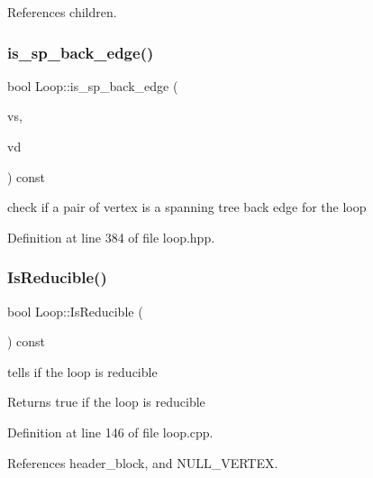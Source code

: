 References children.

\mbox{\label{classLoop_aecc040c0dae0d26555f742ce80f703c4}} 
\subsubsection{\texorpdfstring{is\+\_\+sp\+\_\+back\+\_\+edge()}{is\_sp\_back\_edge()}}
{\footnotesize\ttfamily bool Loop\+::is\+\_\+sp\+\_\+back\+\_\+edge (\begin{DoxyParamCaption}\item[{\hyperlink{graph_8hpp_abefdcf0544e601805af44eca032cca14}{vertex}}]{vs,  }\item[{\hyperlink{graph_8hpp_abefdcf0544e601805af44eca032cca14}{vertex}}]{vd }\end{DoxyParamCaption}) const\hspace{0.3cm}{\ttfamily [inline]}}



check if a pair of vertex is a spanning tree back edge for the loop 



Definition at line 384 of file loop.\+hpp.

\mbox{\label{classLoop_a0b2086cd13346ead18b13a3fa56558d5}} 
\subsubsection{\texorpdfstring{Is\+Reducible()}{IsReducible()}}
{\footnotesize\ttfamily bool Loop\+::\+Is\+Reducible (\begin{DoxyParamCaption}{ }\end{DoxyParamCaption}) const}



tells if the loop is reducible 

\begin{DoxyReturn}{Returns}
true if the loop is reducible 
\end{DoxyReturn}


Definition at line 146 of file loop.\+cpp.



References header\+\_\+block, and N\+U\+L\+L\+\_\+\+V\+E\+R\+T\+EX.



